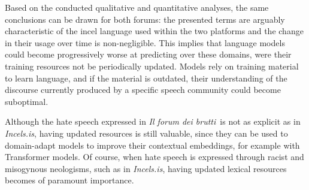 \documentclass[11pt]{article}
\newcommand{\enforum}{\textit{Incels.is}}
\newcommand{\itforum}{\textit{Il forum dei brutti}}
\begin{document}


Based on the conducted qualitative and quantitative analyses, the same conclusions can be drawn for both forums: the presented terms are arguably characteristic of the incel language used within the two platforms and the change in their usage over time is non-negligible. This implies that language models could become progressively worse at predicting over these domains, were their training resources not be periodically updated. Models rely on training material to learn language, and if the material is outdated, their understanding of the discourse currently produced by a specific speech community could become suboptimal.

Although the hate speech expressed in \itforum\, is not as explicit as in \enforum, having updated resources is still valuable, since they can be used to domain-adapt models to improve their contextual embeddings, for example with Transformer models. Of course, when hate speech is expressed through racist and misogynous neologisms, such as in \enforum, having updated lexical resources becomes of paramount importance.
\end{document}
